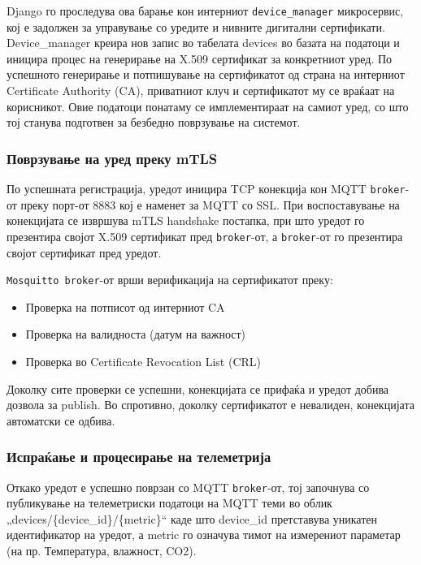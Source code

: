 Django го проследува ова барање кон интерниот \texttt{device\_manager}
микросервис, кој е задолжен за управување со уредите и нивните дигитални
сертификати. Device\_manager креира нов запис во табелата devices во
базата на податоци и иницира процес на генерирање на X.509 сертификат за
конкретниот уред. По успешното генерирање и потпишување на сертификатот
од страна на интерниот Certificate Authority (CA), приватниот клуч и
сертификатот му се враќаат на корисникот. Овие податоци понатаму се
имплементираат на самиот уред, со што тој станува подготвен за безбедно
поврзување на системот.

\subsubsection{Поврзување на уред преку mTLS}

По успешната регистрација, уредот иницира TCP конекција кон MQTT
\texttt{broker}-от преку порт-от 8883 кој е наменет за MQTT со SSL. При
воспоставување на конекцијата се извршува mTLS handshake постапка, при
што уредот го презентира својот X.509 сертификат пред \texttt{broker}-от, а
\texttt{broker}-от го презентира својот сертификат пред уредот.

\texttt{Mosquitto broker}-от врши верификација на сертификатот преку:

\begin{itemize}
\item
  Проверка на потписот од интерниот CA
\item
  Проверка на валидноста (датум на важност)
\item
  Проверка во Certificate Revocation List (CRL)
\end{itemize}

Доколку сите проверки се успешни, конекцијата се прифаќа и уредот добива
дозвола за publish. Во спротивно, доколку сертификатот е невалиден,
конекцијата автоматски се одбива.

\subsubsection{Испраќање и процесирање на телеметрија}

Откако уредот е успешно поврзан со MQTT \texttt{broker}-от, тој започнува со
публикување на телеметриски податоци на MQTT теми во облик
„devices/\{device\_id\}/\{metric\}`` каде што device\_id претставува
уникатен идентификатор на уредот, а metric го означува тимот на
измерениот параметар (на пр. Температура, влажност, CO2).


